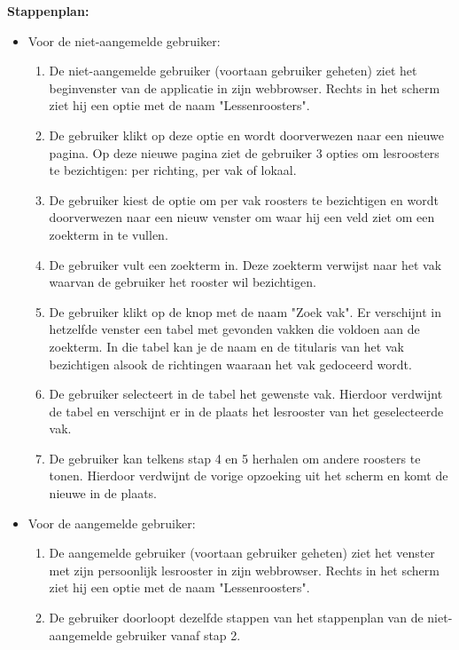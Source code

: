 \textbf{Stappenplan:}
\begin{itemize}
\item Voor de niet-aangemelde gebruiker: 
	\begin{enumerate}
		\item De niet-aangemelde gebruiker (voortaan gebruiker geheten) ziet het beginvenster van de applicatie in zijn webbrowser. Rechts in het scherm ziet hij een optie met de naam "Lessenroosters".
		\item De gebruiker klikt op deze optie en wordt doorverwezen naar een nieuwe pagina. Op deze nieuwe pagina ziet de gebruiker 3 opties om lesroosters te bezichtigen: per richting, per vak of lokaal.
		\item De gebruiker kiest de optie om per vak roosters te bezichtigen en wordt doorverwezen naar een nieuw venster om waar hij een veld ziet om een zoekterm in te vullen.
		\item De gebruiker vult een zoekterm in. Deze zoekterm verwijst naar het vak waarvan de gebruiker het rooster wil bezichtigen.
		\item De gebruiker klikt op de knop met de naam "Zoek vak". Er verschijnt in hetzelfde venster een tabel met gevonden vakken die voldoen aan de zoekterm. In die tabel kan je de naam en de titularis van het vak bezichtigen alsook de richtingen waaraan het vak gedoceerd wordt.
		\item De gebruiker selecteert in de tabel het gewenste vak. Hierdoor verdwijnt de tabel en verschijnt er in de plaats het lesrooster van het geselecteerde vak.
		\item De gebruiker kan telkens stap 4 en 5 herhalen om andere roosters te tonen. Hierdoor verdwijnt de vorige opzoeking uit het scherm en komt de nieuwe in de plaats.
	\end{enumerate}
\item Voor de aangemelde gebruiker:
	\begin{enumerate}
	\item De aangemelde gebruiker (voortaan gebruiker geheten) ziet het venster met zijn persoonlijk lesrooster in zijn webbrowser. Rechts in het scherm ziet hij een optie met de naam "Lessenroosters".
	\item De gebruiker doorloopt dezelfde stappen van het stappenplan van de niet-aangemelde gebruiker vanaf stap 2.
	\end{enumerate}
\end{itemize}

        

